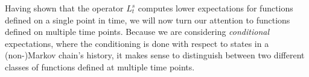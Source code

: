 \documentclass[10pt]{paper}
\theoremstyle{definition}
\newtheorem{definition}{Definition}
\newcommand{\reals}{\mathbb{R}}
\newcommand{\realsnonneg}{\reals_{\geq 0}}
\newcommand{\states}{\mathcal{X}}
\newcommand{\processes}{\mathbb{P}}
\newcommand{\gambles}{\mathcal{L}}
\newcommand{\rateset}{\mathcal{Q}}
\newcommand{\lrate}{\underline{Q}}
\newcommand{\coloneqq}{:\!=}
\begin{document}


Having shown that the operator $L_t^s$ computes lower expectations for functions defined on a single point in time, we will now turn our attention to functions defined on multiple time points. Because we are considering \emph{conditional} expectations, where the conditioning is done with respect to states in a (non-)Markov chain's history, it makes sense to distinguish between two different classes of functions defined at multiple time points. 
\end{document}
